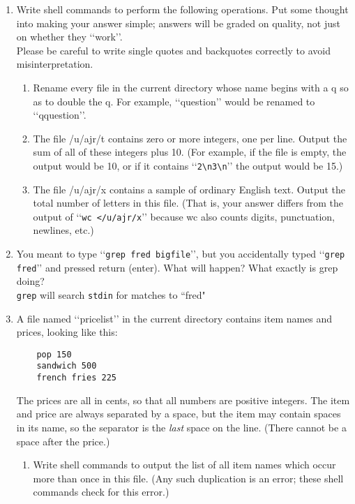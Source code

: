 \documentclass[11pt]{article}
\begin{document}
\begin{enumerate}
	\item Write shell commands to perform the following operations. Put some thought into making your answer simple; answers will be graded on quality, not just on whether they ‘‘work’’.\\
	Please be careful to write single quotes and backquotes correctly to avoid misinterpretation.
		\begin{enumerate}
			\item Rename every file in the current directory whose name begins with a q so as to double the q. For example, ‘‘question’’ would be renamed to ‘‘qquestion’’.
				
				
			\item  The file /u/ajr/t contains zero or more integers, one per line. Output the sum of all of these integers plus 10. (For example, if the file is empty, the output would be 10, or if it contains ‘‘\Verb|2\n3\n|’’ the output would be 15.)
				
				
			\item The file /u/ajr/x contains a sample of ordinary English text. Output the total number of letters in this file. (That is, your answer differs from the output of ‘‘\Verb|wc </u/ajr/x|’’ because wc also counts digits, punctuation, newlines, etc.)
				
		\end{enumerate}
	
	\item You meant to type ‘‘\Verb|grep fred bigfile|’’, but you accidentally typed ‘‘\Verb|grep fred|’’ and pressed return (enter). What will happen? What exactly is grep doing?\\
		\hspace*{1cm} \Verb|grep| will search \Verb|stdin| for matches to ``fred"
		
	\newpage
	\item A file named ‘‘pricelist’’ in the current directory contains item names and prices, looking like
	this:\begin{Verbatim}
	pop 150
	sandwich 500
	french fries 225
	\end{Verbatim}

		The prices are all in cents, so that all numbers are positive integers. The item and price are always separated by a space, but the item may contain spaces in its name, so the separator is the \textit{last} space on the line. (There cannot be a space after the price.)
			\begin{enumerate}
				\item Write shell commands to output the list of all item names which occur more than once in this file. (Any such duplication is an error; these shell commands check for this error.)
					
					

\end{enumerate}
\end{enumerate}
\end{document}
